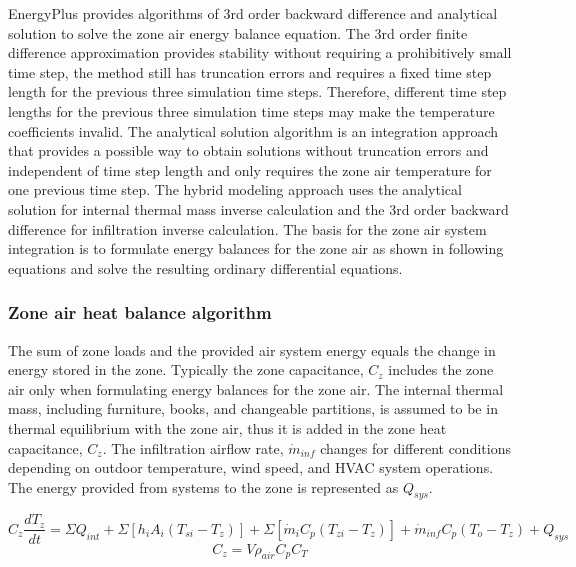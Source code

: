 EnergyPlus provides algorithms of 3rd order backward difference and analytical solution to solve the zone air energy balance equation. The 3rd order finite difference approximation provides stability without requiring a prohibitively small time step, the method still has truncation errors and requires a fixed time step length for the previous three simulation time steps. Therefore, different time step lengths for the previous three simulation time steps may make the temperature coefficients invalid. The analytical solution algorithm is an integration approach that provides a possible way to obtain solutions without truncation errors and independent of time step length and only requires the zone air temperature for one previous time step. The hybrid modeling approach uses the analytical solution for internal thermal mass inverse calculation and the 3rd order backward difference for infiltration inverse calculation. The basis for the zone air system integration is to formulate energy balances for the zone air as shown in following equations and solve the resulting ordinary differential equations. 

\subsubsection{Zone air heat balance algorithm}\label{Zone-air-heat-balance-algorithm}
The sum of zone loads and the provided air system energy equals the change in energy stored in the zone. Typically the zone capacitance, $C_z$ includes the zone air only when formulating energy balances for the zone air. The internal thermal mass, including furniture, books, and changeable partitions, is assumed to be in thermal equilibrium with the zone air, thus it is added in the zone heat capacitance, $C_z$.  The infiltration airflow rate, $\dot{m}_{inf}$ changes for different conditions depending on outdoor temperature, wind speed, and HVAC system operations. The energy provided from systems to the zone is represented as $Q_{sys}$.

\begin{equation}
C_z \frac {dT_z} {dt} = \Sigma Q_{int} +\Sigma[h_i A_i (T_{si} - T_z)] + \Sigma [\dot{m}_i C_p (T_{zi}-T_z)] + \dot{m}_{inf} C_p (T_o - T_z) + Q_{sys}
\end{equation}
\begin{equation}
C_z = V \rho_{air} C_p C_T
\end{equation}

